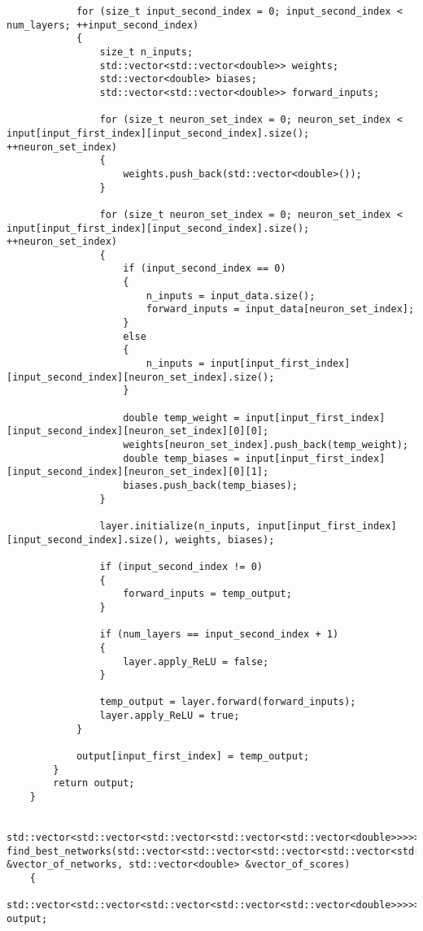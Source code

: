 \begin{verbatim}
            for (size_t input_second_index = 0; input_second_index < num_layers; ++input_second_index)
            {
                size_t n_inputs;
                std::vector<std::vector<double>> weights;
                std::vector<double> biases;
                std::vector<std::vector<double>> forward_inputs;

                for (size_t neuron_set_index = 0; neuron_set_index < input[input_first_index][input_second_index].size(); ++neuron_set_index)
                {
                    weights.push_back(std::vector<double>());
                }

                for (size_t neuron_set_index = 0; neuron_set_index < input[input_first_index][input_second_index].size(); ++neuron_set_index)
                {
                    if (input_second_index == 0)
                    {
                        n_inputs = input_data.size();
                        forward_inputs = input_data[neuron_set_index];
                    }
                    else
                    {
                        n_inputs = input[input_first_index][input_second_index][neuron_set_index].size();
                    }

                    double temp_weight = input[input_first_index][input_second_index][neuron_set_index][0][0];
                    weights[neuron_set_index].push_back(temp_weight);
                    double temp_biases = input[input_first_index][input_second_index][neuron_set_index][0][1];
                    biases.push_back(temp_biases);
                }

                layer.initialize(n_inputs, input[input_first_index][input_second_index].size(), weights, biases);

                if (input_second_index != 0)
                {
                    forward_inputs = temp_output;
                }

                if (num_layers == input_second_index + 1)
                {
                    layer.apply_ReLU = false;
                }

                temp_output = layer.forward(forward_inputs);
                layer.apply_ReLU = true;
            }

            output[input_first_index] = temp_output;
        }
        return output;
    }

    std::vector<std::vector<std::vector<std::vector<std::vector<double>>>>> find_best_networks(std::vector<std::vector<std::vector<std::vector<std::vector<double>>>>> &vector_of_networks, std::vector<double> &vector_of_scores)
    {
        std::vector<std::vector<std::vector<std::vector<std::vector<double>>>>> output;


\end{verbatim}
